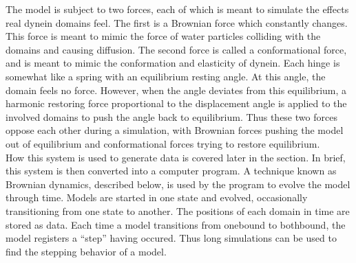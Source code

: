 \documentclass[
11pt, %
english, %
singlespacing, %
headsepline, %
chapterinoneline, %
]{MastersDoctoralThesis} %
\begin{document}
The model is subject to two forces, each of which is meant to simulate the effects real dynein domains feel. The first is a Brownian force which constantly changes. This force is meant to mimic the force of water particles colliding with the domains and causing diffusion. The second force is called a conformational force, and is meant to mimic the conformation and elasticity of dynein. Each hinge is somewhat like a spring with an equilibrium resting angle. At this angle, the domain feels no force. However, when the angle deviates from this equilibrium, a harmonic restoring force proportional to the displacement angle is applied to the involved domains to push the angle back to equilibrium. Thus these two forces oppose each other during a simulation, with Brownian forces pushing the model out of equilibrium and conformational forces trying to restore equilibrium.\\

How this system is used to generate data is covered later in the section. In brief, this system is then converted into a computer program. A technique known as Brownian dynamics, described below, is used by the program to evolve the model through time. Models are started in one state and evolved, occasionally transitioning from one state to another. The positions of each domain in time are stored as data. Each time a model transitions from onebound to bothbound, the model registers a ``step'' having occured. Thus long simulations can be used to find the stepping behavior of a model.\\


\end{document}
